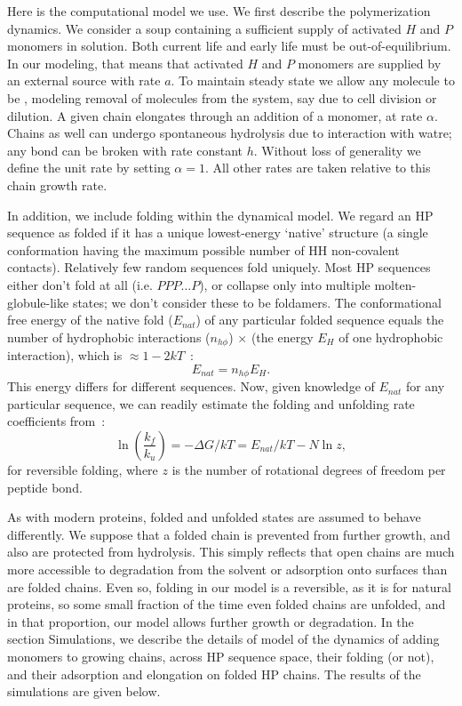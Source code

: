 \documentclass[5p,times]{elsarticle}
\newcommand*{\ga}{\alpha}
\newcommand*{\gD}{\Delta}
\newcommand*{\pt}[1]{\left( #1\right)}
\begin{document}
 Here is the computational model we use.  We first describe the polymerization dynamics.  We 
consider a soup containing a sufficient supply of activated $H$ and $P$ monomers in solution.  Both 
current life and early life must be out-of-equilibrium.  In our modeling, that means that activated 
$H$ and $P$ monomers are supplied by an external source with rate $a$. To 
maintain steady state we allow any molecule to be , modeling removal of molecules from the 
system, 
say due to cell division or dilution.  A given chain elongates 
through an addition of a monomer, at rate $\ga$. Chains 
as well can undergo spontaneous hydrolysis due to interaction with watre; any bond can be 
broken with rate constant $h$. Without loss of generality we define the unit 
rate by setting $\ga = 1$.  All other rates are taken relative to this chain growth rate.   


 In addition, we include folding within the dynamical model.  We regard an HP sequence as folded if 
it has a unique lowest-energy `native' structure (a single conformation having the maximum possible 
number of HH non-covalent contacts).  Relatively few random sequences fold uniquely.  Most HP 
sequences either don't fold at all (i.e. $PPP \ldots P$), or collapse only into multiple 
molten-globule-like states; we don't consider these to be foldamers.   
The conformational free energy of the native fold ($E_{nat}$) of any particular folded sequence 
equals 
the number of hydrophobic interactions ($n_{h\phi}$) $\times$ (the energy $E_H$ of one hydrophobic 
interaction), which is $\approx 1-2kT$~\cite{Ghosh2009}:
\begin{equation}
 E_{nat}=n_{h\phi}E_H.
\end{equation} 
This energy differs for different sequences.  Now, given knowledge of $E_{nat}$ for any particular 
sequence, we can readily estimate the folding and unfolding rate coefficients from~\cite{Ghosh2009}:
\begin{equation}
 \ln\pt{\frac{k_f}{k_u}}=-\gD G/kT = E_{nat}/kT-N\ln z,
\end{equation} 
for reversible folding, where $z$ is the number of rotational degrees of freedom per peptide bond. 
 
 As with modern proteins, folded and unfolded states are assumed to behave differently.  We suppose 
that a folded chain is prevented from further growth, and also are protected from hydrolysis.  This 
simply reflects that open chains are much more accessible to degradation from the solvent or 
adsorption onto surfaces than are folded chains.  Even so, folding in our model is a reversible, as 
it is for natural proteins, so some small fraction of the time even folded chains are unfolded, and 
in that proportion, our model allows further growth or degradation.   In the section Simulations, 
we describe the details of model of the dynamics of adding 
monomers to growing chains, across HP sequence space, their folding (or not), and their adsorption 
and elongation on folded HP chains.  The results of the simulations are given below.
 
\end{document}
